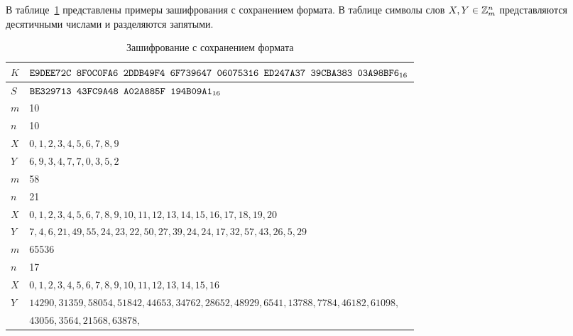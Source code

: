\label{TEST.FMT}

В таблице~\ref{Table.TEST.FMTE} представлены примеры зашифрования 
с сохранением формата. В таблице символы слов $X,Y\in\mathbb{Z}_m^n$ 
представляются десятичными числами и разделяются запятыми. 

\begin{table}[H]
\caption{Зашифрование с сохранением формата}\label{Table.TEST.FMTE}
\begin{tabular}{|l|l|}
\hline
$K$ & 
$\texttt{E9DEE72C~8F0C0FA6~2DDB49F4~6F739647~06075316~ED247A37~39CBA383~03A98BF6}_{16}$\\
\hline
$S$ & 
$\texttt{BE329713~43FC9A48~A02A885F~194B09A1}_{16}$\\
\ddhline
$m$ & 10\\
\hline
$n$ & 10\\
\hline
$X$ &
$0,1,2,3,4,5,6,7,8,9$\\
\dhline
$Y$ & 
$6,9,3,4,7,7,0,3,5,2$\\
\ddhline
$m$ & 58\\
\hline
$n$ & 21\\
\hline
$X$ &
$0,1,2,3,4,5,6,7,8,9,10,11,12,13,14,15,16,17,18,19,20$\\
\dhline
$Y$ & 
$7,4,6,21,49,55,24,23,22,50,27,39,24,24,17,32,57,43,26,5,29$\\
\ddhline
$m$ & 65536\\
\hline
$n$ & 17\\
\hline
$X$ &
$0,1,2,3,4,5,6,7,8,9,10,11,12,13,14,15,16$\\
\dhline
$Y$ & 
$14290,31359,58054,51842,44653,34762,28652,48929,6541,13788,7784,46182,61098,$\\
& $43056,3564,21568,63878,$\\
\hline
\end{tabular}
\end{table}

